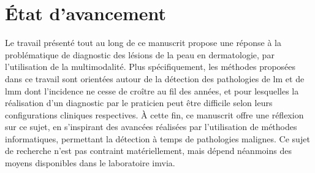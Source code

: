 \renewcommand{\thechapter}{\roman{chapter}}
\setcounter{chapter}{5}
\setcounter{figure}{0}

\label{chap:conclusion}

\section*{État d'avancement}
Le travail présenté tout au long de ce manuscrit propose une réponse à la problématique de diagnostic des lésions de la peau en dermatologie, par l'utilisation de la multimodalité. Plus spécifiquement, les méthodes proposées dans ce travail sont orientées autour de la détection des pathologies de \gls{lm} et de \gls{lmm} dont l'incidence ne cesse de croître au fil des années, et pour lesquelles la réalisation d'un diagnostic par le praticien peut être difficile selon leurs configurations cliniques respectives. À cette fin, ce manuscrit offre une réflexion sur ce sujet, en s'inspirant des avancées réalisées par l'utilisation de méthodes informatiques, permettant la détection à temps de pathologies malignes. Ce sujet de recherche n'est pas contraint matériellement, mais dépend néanmoins des moyens disponibles dans le laboratoire \gls{imvia}.\par

